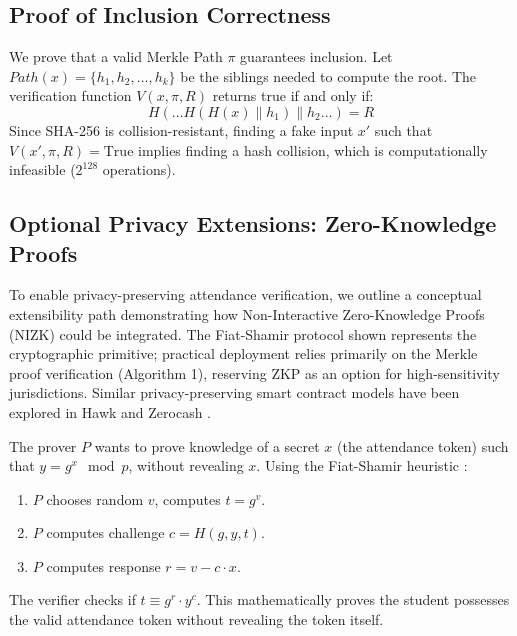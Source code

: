 \documentclass[conference]{IEEEtran}
\begin{document}
\subsection{Proof of Inclusion Correctness}
We prove that a valid Merkle Path $\pi$ guarantees inclusion.
Let $Path(x) = \{h_1, h_2, \dots, h_k\}$ be the siblings needed to compute the root.
The verification function $V(x, \pi, R)$ returns true if and only if:
\begin{equation}
H( \dots H(H(x) \parallel h_1) \parallel h_2 \dots ) = R
\end{equation}
Since SHA-256 is collision-resistant, finding a fake input $x'$ such that $V(x', \pi, R) = \text{True}$ implies finding a hash collision, which is computationally infeasible ($2^{128}$ operations).

\subsection{Optional Privacy Extensions: Zero-Knowledge Proofs}
To enable privacy-preserving attendance verification, we outline a conceptual extensibility path demonstrating how Non-Interactive Zero-Knowledge Proofs (NIZK) could be integrated. The Fiat-Shamir protocol shown represents the cryptographic primitive; practical deployment relies primarily on the Merkle proof verification (Algorithm 1), reserving ZKP as an option for high-sensitivity jurisdictions. Similar privacy-preserving smart contract models have been explored in Hawk \cite{b13} and Zerocash \cite{b12}.

The prover $P$ wants to prove knowledge of a secret $x$ (the attendance token) such that $y = g^x \mod p$, without revealing $x$.
Using the Fiat-Shamir heuristic \cite{b11}:
\begin{enumerate}
    \item $P$ chooses random $v$, computes $t = g^v$.
    \item $P$ computes challenge $c = H(g, y, t)$.
    \item $P$ computes response $r = v - c \cdot x$.
\end{enumerate}
The verifier checks if $t \equiv g^r \cdot y^c$. This mathematically proves the student possesses the valid attendance token without revealing the token itself.

\end{document}
